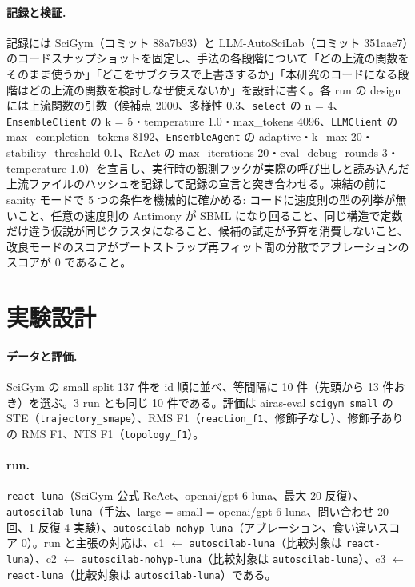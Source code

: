 \documentclass{article}
\begin{document}
\paragraph{記録と検証.}
記録には SciGym（コミット 88a7b93）と LLM-AutoSciLab（コミット 351aae7）のコードスナップショットを固定し、手法の各段階について「どの上流の関数をそのまま使うか」「どこをサブクラスで上書きするか」「本研究のコードになる段階はどの上流の関数を検討しなぜ使えないか」を設計に書く。各 run の design には上流関数の引数（候補点 2000、多様性 0.3、\texttt{select} の n = 4、\texttt{EnsembleClient} の k = 5・temperature 1.0・max\_tokens 4096、\texttt{LLMClient} の max\_completion\_tokens 8192、\texttt{EnsembleAgent} の adaptive・k\_max 20・stability\_threshold 0.1、ReAct の max\_iterations 20・eval\_debug\_rounds 3・temperature 1.0）を宣言し、実行時の観測フックが実際の呼び出しと読み込んだ上流ファイルのハッシュを記録して記録の宣言と突き合わせる。凍結の前に sanity モードで 5 つの条件を機械的に確かめる: コードに速度則の型の列挙が無いこと、任意の速度則の Antimony が SBML になり回ること、同じ構造で定数だけ違う仮説が同じクラスタになること、候補の試走が予算を消費しないこと、改良モードのスコアがブートストラップ再フィット間の分散でアブレーションのスコアが 0 であること。

\section{実験設計}
\label{sec:design}
\paragraph{データと評価.}
SciGym の small split 137 件を id 順に並べ、等間隔に 10 件（先頭から 13 件おき）を選ぶ。3 run とも同じ 10 件である。評価は airas-eval \texttt{scigym\_small} の STE（\texttt{trajectory\_smape}）、RMS F1（\texttt{reaction\_f1}、修飾子なし）、修飾子ありの RMS F1、NTS F1（\texttt{topology\_f1}）。

\paragraph{run.}
\texttt{react-luna}（SciGym 公式 ReAct、openai/gpt-6-luna、最大 20 反復）、\texttt{autoscilab-luna}（手法、large = small = openai/gpt-6-luna、問い合わせ 20 回、1 反復 4 実験）、\texttt{autoscilab-nohyp-luna}（アブレーション、食い違いスコア 0）。run と主張の対応は、c1 $\leftarrow$ \texttt{autoscilab-luna}（比較対象は \texttt{react-luna}）、c2 $\leftarrow$ \texttt{autoscilab-nohyp-luna}（比較対象は \texttt{autoscilab-luna}）、c3 $\leftarrow$ \texttt{react-luna}（比較対象は \texttt{autoscilab-luna}）である。
\end{document}
